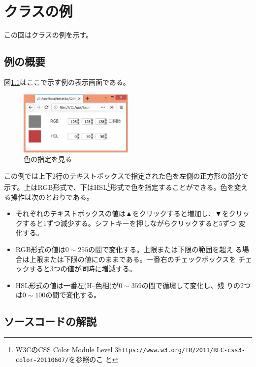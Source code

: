 \chapter{クラスの例}
この回はクラスの例を示す。
\section{例の概要}
図\ref{color}はここで示す例の表示画面である。
\begin{figure}[ht]
 \begin{center}
  \includegraphics[width=0.5\textwidth]{13Ex.eps}
 \end{center}
 \caption{色の指定を見る}\label{color}
\end{figure}

この例では上下2行のテキストボックスで指定された色を左側の正方形の部分で
示す。上はRGB形式で、下はHSL\footnote{W3CのCSS Color Module Level
3\texttt{https://www.w3.org/TR/2011/REC-css3-color-20110607/}を参照のこ
と}形式で色を指定することができる。色を変える操作は次のとおりである。
\begin{itemize}
 \item それぞれのテキストボックスの値は▲をクリックすると増加し、▼をクリッ
       クすると1ずつ減少する。シフトキーを押しながらクリックすると5ずつ
       変化する。
 \item RGB形式の値は$0\sim255$の間で変化する。上限または下限の範囲を超え
       る場合は上限または下限の値にのままである。一番右のチェックボックスを
       チェックすると3つの値が同時に増減する。
 \item HSL形式の値は一番左(H--色相)が$0\sim359$の間で循環して変化し、残
       りの2つは$0\sim100$の間で変化する。
\end{itemize}
\section{ソースコードの解説}
